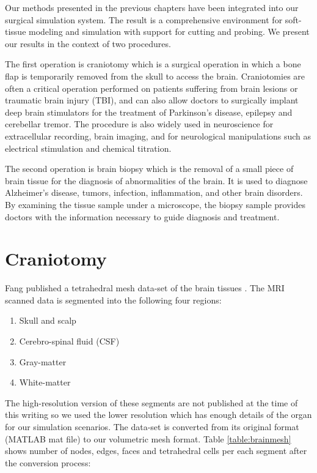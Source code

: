 \label{chapter:evaluation}
Our methods presented in the previous chapters have been integrated into our surgical simulation system. 
The result is a comprehensive environment for soft-tissue modeling and simulation with support for cutting and
probing. We present our results in the context of two procedures.

The first operation is craniotomy which is a surgical operation in which a bone flap is temporarily removed 
from the skull to access the brain. Craniotomies are often a critical operation performed on patients suffering 
from brain lesions or traumatic brain injury (TBI), and can also allow doctors to surgically implant deep brain 
stimulators for the treatment of Parkinson's disease, epilepsy and cerebellar tremor. The procedure is also widely 
used in neuroscience for extracellular recording, brain imaging, and for neurological manipulations such as electrical 
stimulation and chemical titration.

The second operation is brain biopsy which is the removal of a small piece of brain tissue for the diagnosis of abnormalities 
of the brain. It is used to diagnose Alzheimer's disease, tumors, infection, inflammation, and other brain disorders. By examining 
the tissue sample under a microscope, the biopsy sample provides doctors with the information necessary to guide diagnosis and 
treatment.

\section{Craniotomy}
Fang \etal published a tetrahedral mesh data-set of the brain tissues \cite{fang2010mesh}. The MRI scanned data is 
segmented into the following four regions:

\begin{enumerate}
 \item Skull and scalp
 \item Cerebro-spinal fluid (CSF)
 \item Gray-matter
 \item White-matter
\end{enumerate}

The high-resolution version of these segments are not published at the time of this writing so we used the lower resolution 
which has enough details of the organ for our simulation scenarios. The data-set is converted from its original format 
(MATLAB mat file) to our volumetric mesh format. Table \ref{table:brainmesh} shows number of nodes, edges, faces and tetrahedral cells 
per each segment after the conversion process:

